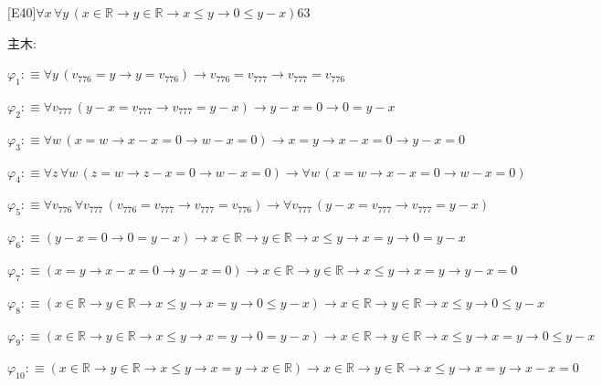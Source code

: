 \begin{fullproof}{[E40]}{$\forall x\,\forall y\,(x \in \mathbb{R} \to y \in \mathbb{R} \to x \leq y \to 0 \leq y - x)$}{63}
\begin{ptree}
\end{ptree}
\noindent 主木:
\begin{ptree}
\noLine
{}
\noLine
{}
\end{ptree}
\begin{abbrevlist}
\item $\varphi_{1} :\equiv \forall y\,(v_{776} = y \to y = v_{776}) \to v_{776} = v_{777} \to v_{777} = v_{776}$
\item $\varphi_{2} :\equiv \forall v_{777}\,(y - x = v_{777} \to v_{777} = y - x) \to y - x = 0 \to 0 = y - x$
\item $\varphi_{3} :\equiv \forall w\,(x = w \to x - x = 0 \to w - x = 0) \to x = y \to x - x = 0 \to y - x = 0$
\item $\varphi_{4} :\equiv \forall z\,\forall w\,(z = w \to z - x = 0 \to w - x = 0) \to \forall w\,(x = w \to x - x = 0 \to w - x = 0)$
\item $\varphi_{5} :\equiv \forall v_{776}\,\forall v_{777}\,(v_{776} = v_{777} \to v_{777} = v_{776}) \to \forall v_{777}\,(y - x = v_{777} \to v_{777} = y - x)$
\item $\varphi_{6} :\equiv (y - x = 0 \to 0 = y - x) \to x \in \mathbb{R} \to y \in \mathbb{R} \to x \leq y \to x = y \to 0 = y - x$
\item $\varphi_{7} :\equiv (x = y \to x - x = 0 \to y - x = 0) \to x \in \mathbb{R} \to y \in \mathbb{R} \to x \leq y \to x = y \to y - x = 0$
\item $\varphi_{8} :\equiv (x \in \mathbb{R} \to y \in \mathbb{R} \to x \leq y \to x = y \to 0 \leq y - x) \to x \in \mathbb{R} \to y \in \mathbb{R} \to x \leq y \to 0 \leq y - x$
\item $\varphi_{9} :\equiv (x \in \mathbb{R} \to y \in \mathbb{R} \to x \leq y \to x = y \to 0 = y - x) \to x \in \mathbb{R} \to y \in \mathbb{R} \to x \leq y \to x = y \to 0 \leq y - x$
\item $\varphi_{10} :\equiv (x \in \mathbb{R} \to y \in \mathbb{R} \to x \leq y \to x = y \to x \in \mathbb{R}) \to x \in \mathbb{R} \to y \in \mathbb{R} \to x \leq y \to x = y \to x - x = 0$

\end{abbrevlist}
\end{fullproof}
